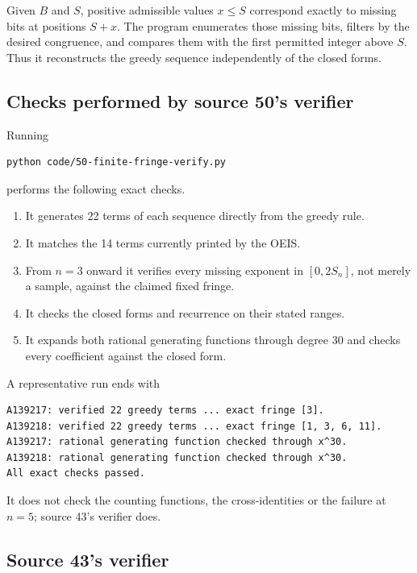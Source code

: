\documentclass[11pt,a4paper]{article}
\numberwithin{equation}{section}
\theoremstyle{definition}
\theoremstyle{remark}
\theoremstyle{plain}
\begin{document}
Given $B$ and $S$, positive admissible values $x\le S$ correspond exactly to
missing bits at positions $S+x$.  The program enumerates those missing bits,
filters by the desired congruence, and compares them with the first permitted
integer above $S$.  Thus it reconstructs the greedy sequence independently of
the closed forms.

\subsection{Checks performed by source 50's verifier}

Running
\begin{verbatim}
python code/50-finite-fringe-verify.py
\end{verbatim}
performs the following exact checks.
\begin{enumerate}[label=(\roman*)]
\item It generates 22 terms of each sequence directly from the greedy rule.
\item It matches the 14 terms currently printed by the OEIS.
\item From $n=3$ onward it verifies every missing exponent in
      $[0,2S_n]$, not merely a sample, against the claimed fixed fringe.
\item It checks the closed forms and recurrence on their stated ranges.
\item It expands both rational generating functions through degree 30 and
      checks every coefficient against the closed form.
\end{enumerate}
A representative run ends with
\begin{verbatim}
A139217: verified 22 greedy terms ... exact fringe [3].
A139218: verified 22 greedy terms ... exact fringe [1, 3, 6, 11].
A139217: rational generating function checked through x^30.
A139218: rational generating function checked through x^30.
All exact checks passed.
\end{verbatim}
It does not check the counting functions, the cross-identities or the failure
at $n=5$; source 43's verifier does.

\subsection{Source 43's verifier}
\end{document}
